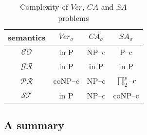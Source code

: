 \begin{table}[ht!]
    \centering
    \caption{Complexity of $Ver$, $CA$ and $SA$ problems}
    \label{tab: complexity}
    \renewcommand{\arraystretch}{1.5}
    \begin{tabular}{c||ccc}
    \hline

    semantics & $Ver_\sigma$ & $CA_\sigma$ & $SA_\sigma$   \\
    \hline

    $\mathcal{CO}$ & 
    in P & 
    NP--c & 
    P--c  \\

    $\mathcal{GR}$ & 
    in P & 
    in P & 
    in P  \\

    $\mathcal{PR}$ & 
    coNP--c & 
    NP--c & 
    $\prod^p_2$--c  \\

    $\mathcal{ST}$ & 
    in P & 
    NP--c & 
    coNP--c  \\
    
    \hline
\end{tabular}
\end{table}











\newpage
{}
\subsection{A summary}




